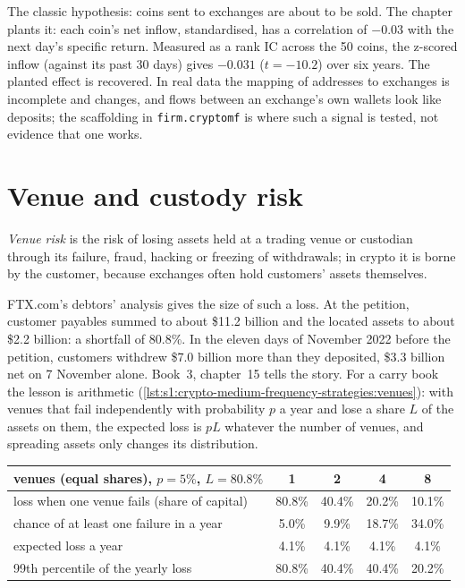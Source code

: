 The classic hypothesis: coins sent to exchanges are about to be sold. The chapter plants it: each coin's net inflow, standardised, has a correlation of
$-0.03$ with the next day's specific return. Measured as a rank IC across the 50 coins, the z-scored inflow (against its past 30 days) gives $-0.031$
($t = -10.2$) over six years. The planted effect is recovered. In real data the mapping of addresses to exchanges is incomplete and changes, and flows
between an exchange's own wallets look like deposits; the scaffolding in \texttt{firm.cryptomf} is where such a signal is tested, not evidence that one
works.

\section{Venue and custody risk}

\begin{definition}\label{def:s1:crypto-medium-frequency-strategies:venue}
\emph{Venue risk} is the risk of losing assets held at a trading venue or custodian through its failure, fraud, hacking or freezing of
withdrawals; in crypto it is borne by the customer, because exchanges often hold customers' assets themselves.
\end{definition}

FTX.com's debtors' analysis gives the size of such a loss. At the petition, customer payables summed to about \$11.2 billion and the located assets to
about \$2.2 billion: a shortfall of 80.8\%. In the eleven days of November 2022 before the petition, customers withdrew \$7.0 billion more than they
deposited, \$3.3 billion net on 7 November alone. Book~3, chapter~15 tells the story. For a carry book the lesson is arithmetic
(\cref{lst:s1:crypto-medium-frequency-strategies:venues}): with venues that fail independently with probability $p$ a year and lose a share $L$ of the
assets on them, the expected loss is $pL$ whatever the number of venues, and spreading assets only changes its distribution.

\begin{center}
\small
\begin{tabular}{@{}lcccc@{}}
\toprule
venues (equal shares), $p = 5\%$, $L = 80.8\%$ & 1 & 2 & 4 & 8\\
\midrule
loss when one venue fails (share of capital) & 80.8\% & 40.4\% & 20.2\% & 10.1\%\\
chance of at least one failure in a year & 5.0\% & 9.9\% & 18.7\% & 34.0\%\\
expected loss a year & 4.1\% & 4.1\% & 4.1\% & 4.1\%\\
99th percentile of the yearly loss & 80.8\% & 40.4\% & 40.4\% & 20.2\%\\
\bottomrule
\end{tabular}
\end{center}

